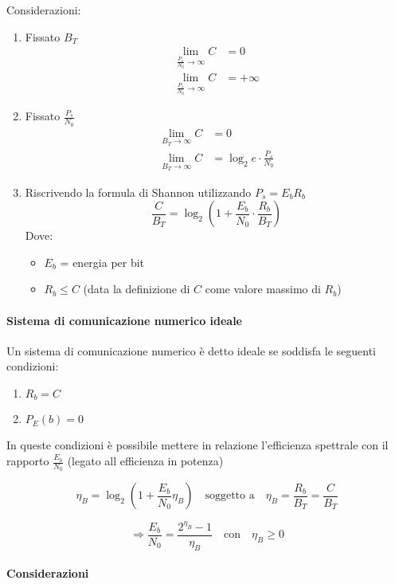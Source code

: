Considerazioni:

\begin{enumerate}
  \item Fissato \( B_T \)
  \begin{align*}
    \lim_{\frac{P_s}{N_0} \to \infty} C &= 0 \\
    \lim_{\frac{P_s}{N_0} \to \infty} C &= +\infty
  \end{align*}

  \item Fissato \( \frac{P_s}{N_0} \)
  \begin{align*}
    \lim_{B_T \to \infty} C &= 0 \\
    \lim_{B_T \to \infty} C &= \log_2 e \cdot \frac{P_s}{N_0}
  \end{align*}

  \item Riscrivendo la formula di Shannon utilizzando \( P_s = E_b R_b \)
  \[
  \frac{C}{B_T} = \log_2 \left( 1 + \frac{E_b}{N_0} \cdot \frac{R_b}{B_T} \right)
  \]
  Dove:
  \begin{itemize}
    \item \( E_b \) = energia per bit
    \item \( R_b \leq C \) (data la definizione di \( C \) come valore massimo di \( R_b \))
  \end{itemize}
\end{enumerate}

\paragraph*{Sistema di comunicazione numerico ideale}
Un sistema di comunicazione numerico è detto ideale se soddisfa le seguenti condizioni:
\begin{enumerate}
  \item \( R_b = C \)
  \item \( P_E(b) = 0 \)
\end{enumerate}

In queste condizioni è possibile mettere in relazione l'efficienza spettrale con il rapporto \( \frac{E_b}{N_0} \) (legato all
efficienza in potenza)

\[
\eta_B = \log_2 \left( 1 + \frac{E_b}{N_0} \eta_B  \right) \quad \text{soggetto a} \quad  \eta_B = \frac{R_b}{B_T} = \frac{C}{B_T}
\]

\[
\Rightarrow \frac{E_b}{N_0} = \frac{2^{\eta_B} - 1}{\eta_B} \quad \text{con} \quad \eta_B \geq 0
\]


\paragraph*{Considerazioni}

